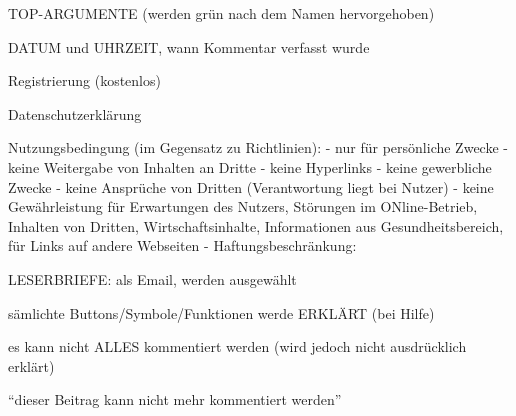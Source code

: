 TOP-ARGUMENTE (werden grün nach dem Namen hervorgehoben)

DATUM und UHRZEIT, wann Kommentar verfasst wurde

Registrierung (kostenlos)

Datenschutzerklärung

Nutzungsbedingung (im Gegensatz zu Richtlinien):
- nur für persönliche Zwecke
- keine Weitergabe von Inhalten an Dritte
- keine Hyperlinks
- keine gewerbliche Zwecke
- keine Ansprüche von Dritten (Verantwortung liegt bei Nutzer)
- keine Gewährleistung für Erwartungen des Nutzers, Störungen im ONline-Betrieb, Inhalten von Dritten, Wirtschaftsinhalte, Informationen aus Gesundheitsbereich, für Links auf andere Webseiten
- Haftungsbeschränkung: 


LESERBRIEFE: als Email, werden ausgewählt

sämlichte Buttons/Symbole/Funktionen werde ERKLÄRT (bei Hilfe)

es kann nicht ALLES kommentiert werden (wird jedoch nicht ausdrücklich erklärt)

``dieser Beitrag kann nicht mehr kommentiert werden''






